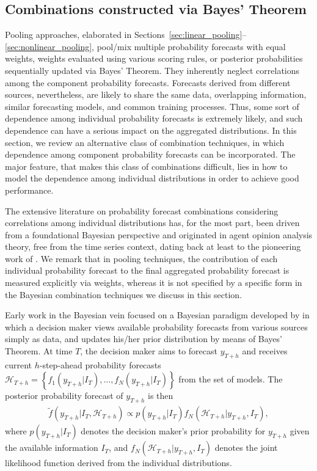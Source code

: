 \documentclass[a4paper,11pt]{article}
\begin{document}
\subsection{Combinations constructed via Bayes' Theorem}
\label{sec:bayesian_comb}

Pooling approaches, elaborated in Sections~\ref{sec:linear_pooling}--\ref{sec:nonlinear_pooling}, pool/mix multiple probability forecasts with equal weights, weights evaluated using various scoring rules, or posterior probabilities sequentially updated via Bayes' Theorem. They inherently neglect correlations among the component probability forecasts. Forecasts derived from different sources, nevertheless, are likely to share the same data, overlapping information, similar forecasting models, and common training processes. Thus, some sort of dependence among individual probability forecasts is extremely likely, and such dependence can have a serious impact on the aggregated distributions. In this section, we review an alternative class of combination techniques, in which dependence among component probability forecasts can be incorporated. The major feature, that makes this class of combinations difficult, lies in how to model the dependence among individual distributions in order to achieve good performance.

The extensive literature on probability forecast combinations considering correlations among individual distributions has, for the most part, been driven from a foundational Bayesian perspective and originated in agent opinion analysis theory, free from the time series context, dating back at least to the pioneering work of \citet{Winkler1968-uw}. We remark that in pooling techniques, the contribution of each individual probability forecast to the final aggregated probability forecast is measured explicitly via weights, whereas it is not specified by a specific form in the Bayesian combination techniques we discuss in this section.

Early work in the Bayesian vein focused on a Bayesian paradigm developed by \citet{Morris1974-yh,Morris1977-xl} in which a decision maker views available probability forecasts from various sources simply as data, and updates his/her prior distribution by means of Bayes' Theorem. At time $T$, the decision maker aims to forecast $y_{T+h}$ and receives current $h$-step-ahead probability forecasts $\mathcal{H}_{T+h} = \left\{f_{1}(y_{T+h}|I_{T}), \dots, f_{N}(y_{T+h}|I_{T})\right\}$ from the set of models. The posterior probability forecast of $y_{T+h}$ is then
\begin{align}
  \label{eq:bayes_theorem}
  \tilde{f}\left(y_{T+h} | I_{T}, \mathcal{H}_{T+h}\right) \propto p\left(y_{T+h} | I_{T}\right) f_{N}\left(\mathcal{H}_{T+h} | y_{T+h}, I_{T}\right),
\end{align}
where $p\left(y_{T+h} | I_{T}\right)$ denotes the decision maker's prior probability for $y_{T+h}$ given the available information $I_{T}$, and $f_{N}\left(\mathcal{H}_{T+h} | y_{T+h}, I_{T}\right)$ denotes the joint likelihood function derived from the individual distributions.
\end{document}
